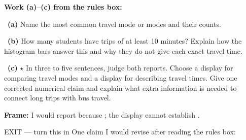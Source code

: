 \documentclass[11pt]{article}
\begin{document}
\newpage
\textbf{Work (a)--(c) from the rules box:}\par\smallskip

~\textbf{(a)} Name the most common travel mode or modes and their counts.\par
\workspace{0.6in}

~\textbf{(b)} How many students have trips of at least 10 minutes? Explain how the histogram bars answer this and why they do not give each exact travel time.\par
\workspace{1.3in}

~\textbf{(c)} $\star$ In three to five sentences, judge both reports. Choose a display for comparing travel modes and a display for describing travel times. Give one corrected numerical claim and explain what extra information is needed to connect long trips with bus travel.\par
\workspace{2.1in}

\begin{sentenceframebox}\raggedright\textbf{Frame:} I would report \blank[1.5in] because \blank[2.6in]; the display cannot establish \blank[2in].\end{sentenceframebox}

\begin{summaryexitbox}{EXIT --- turn this in}
One claim I would revise after reading the rules box: \hrulefill\par
\workspace{0.4in}
\end{summaryexitbox}
\end{document}
